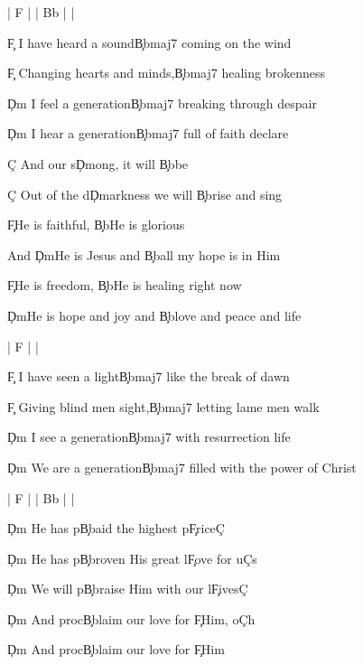 \documentclass[9pt]{extarticle}
\begin{document}
\bsong

\bi
| F |  | Bb |  |
\ei

\bv
\c{F} I have heard a sound\c{Bbmaj7} coming on the wind

\c{F} Changing hearts and minds,\c{Bbmaj7} healing brokenness

\c{Dm} I feel a generation\c{Bbmaj7} breaking through despair

\c{Dm} I hear a generation\c{Bbmaj7} full of faith declare
\ev

\bp
\c{C} And our s\c{Dm}ong, it will \c{Bb}be

\c{C} Out of the d\c{Dm}arkness we will \c{Bb}rise and sing
\ep

\bc
\c{F}He is faithful, \c{Bb}He is glorious

And \c{Dm}He is Jesus and \c{Bb}all my hope is in Him

\c{F}He is freedom, \c{Bb}He is healing right now

\c{Dm}He is hope and joy and \c{Bb}love and peace and life
\ec

\bin
| F |  |
\ein

\bv
\c{F} I have seen a light\c{Bbmaj7} like the break of dawn

\c{F} Giving blind men sight,\c{Bbmaj7} letting lame men walk

\c{Dm} I see a generation\c{Bbmaj7} with resurrection life

\c{Dm} We are a generation\c{Bbmaj7} filled with the power of Christ
\ev



\bin
| F |  | Bb |  |
\ein

\bb[2]
\c{Dm} He has p\c{Bb}aid the highest p\c{F}rice\c{C}

\c{Dm} He has p\c{Bb}roven His great l\c{F}ove for u\c{C}s

\c{Dm} We will p\c{Bb}raise Him with our l\c{F}ives\c{C}

\c{Dm} And proc\c{Bb}laim our love for \c{F}Him, o\c{C}h
\eb

\bt
\c{Dm} And proc\c{Bb}laim our love for \c{F}Him
\et

\esong
\end{document}
